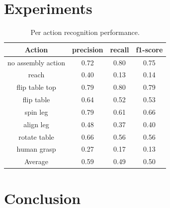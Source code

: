 \documentclass[letterpaper, 10 pt, conference, onecolumn]{IEEEtran}
\begin{document}

\section{Experiments}

\begin{table}
    \caption{Per action recognition performance.}
    \centering
    \begin{tabular}{c c c c}
        \toprule
        \textbf{Action}    & \textbf{precision} & \textbf{recall} & \textbf{f1-score} \\
        \midrule
        no assembly action & 0.72               & 0.80            & 0.75              \\
        reach              & 0.40               & 0.13            & 0.14              \\
        flip table top     & 0.79               & 0.80            & 0.79              \\
        flip table         & 0.64               & 0.52            & 0.53              \\
        spin leg           & 0.79               & 0.61            & 0.66              \\
        align leg          & 0.48               & 0.37            & 0.40              \\
        rotate table       & 0.66               & 0.56            & 0.56              \\
        human grasp        & 0.27               & 0.17            & 0.13              \\
        \midrule
        Average            & 0.59               & 0.49            & 0.50              \\
        \bottomrule
    \end{tabular}
    \label{tab:results:per_action_performance}
\end{table}




\section{Conclusion}




\end{document}
